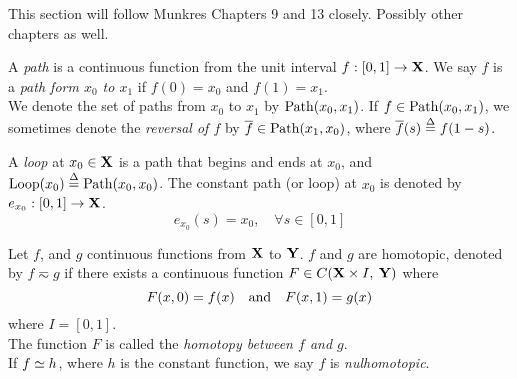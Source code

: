 \documentclass[../main-manifolds.tex]{subfiles}
\begin{document}
\newpage


This section will follow Munkres Chapters 9 and 13 closely. Possibly other chapters as well.

\begin{definition}[Path]\label{munkres:path}
    A \emph{path} is a continuous function from the unit interval $f:[0,1]\to {\mathbf{X}}$. We say $f$ is a \emph{path form $x_0$ to $x_1$} if $f(0)=x_0$ and $f(1)=x_1$.\\

    We denote the set of paths from $x_0$ to $x_1$ by $\Path[x_0, x_1]$. If $f\in\Path[x_0,x_1]$, we sometimes denote the \emph{reversal of $f$} by $\cl{f}\in\Path[x_1,x_0]$, where $\overline{f}(s)\overset{\Delta}{=} f(1-s)$.
\end{definition}

\begin{definition}[Loop]\label{munkres:loop}
    A \emph{loop} at $x_0\in{\mathbf{X}}$ is a path that begins and ends at $x_0$, and $\Loop[x_0]\defined\Path[x_0,x_0]$. The constant path (or loop) at $x_0$ is denoted by $e_{x_0}: [0,1]\to {\mathbf{X}}$. 
    \[
        e_{x_0}(s)=x_0,\quad \forall s\in[0,1]
    \]
\end{definition}
\begin{definition}[Homotopy of $C(\xx,\:\yy)$]\label{munkres:homotopy-of-functions}
    Let $f$, and $g$ continuous functions from ${\mathbf{X}}$ to ${\mathbf{Y}}$. $f$ and $g$ are homotopic, denoted by $f\eqsim g$ if there exists a continuous function $F\in C({\mathbf{X}}\times I,\: {\mathbf{Y}})$ where
    \begin{equation}\label{munkres:homotopy-functions-equation}
        F(x,0)=f(x)\qqtext{and} F(x,1) = g(x)
    \end{equation}
    where $I = [0,1]$.\\

    The function $F$ is called the \emph{homotopy between $f$ and $g$}.\\

    If $f\simeq h$, where $h$ is the constant function, we say $f$ is \emph{nulhomotopic}.
\end{definition}
\end{document}

